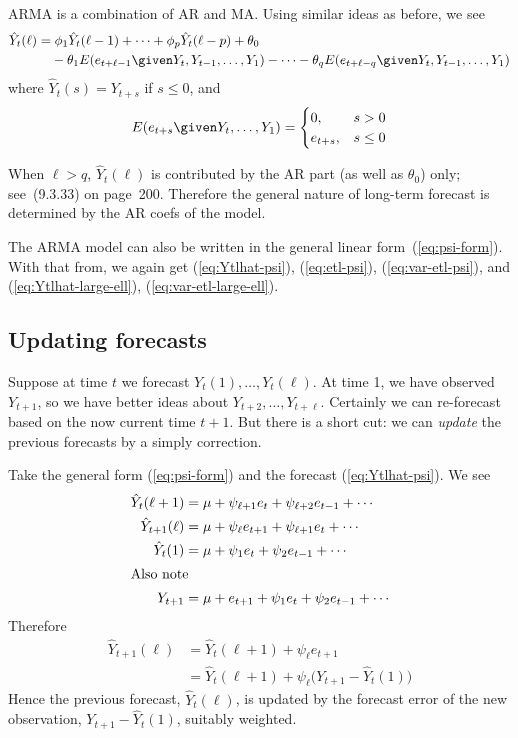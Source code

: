 \documentclass[12pt]{article}
\begin{document}
ARMA is a combination of AR and MA.
Using similar ideas as before, we see
\[\begin{split}
\hat{Y}_t(\ell)
&= \phi_1 \hat{Y}_t(\ell-1) + \dotsb + \phi_p \hat{Y}_t(\ell - p)
    + \theta_0
\\
&\phantom{\mathrel{=}\;}
    - \theta_1 E(e_{t+\ell-1} \given Y_t, Y_{t-1},\dotsc, Y_1)
    - \dotsb
    - \theta_q E(e_{t+\ell-q} \given Y_t, Y_{t-1},\dotsc, Y_1)
\end{split}
\]
where
$\hat{Y}_t(s) = Y_{t+s}$ if $s \le 0$,
and
\[
E(e_{t+s} \given Y_t,\dotsc,Y_1)
= \begin{cases}
0, & s > 0\\
e_{t+s}, & s \le 0
\end{cases}
\]

When $\ell > q$, $\hat{Y}_t(\ell)$ is contributed by the AR part
(as well as $\theta_0$) only;
see~(9.3.33) on page~200.
Therefore the general nature of long-term forecast is determined by the
AR coefs of the model.

The ARMA model can also be written in the general linear
form~(\ref{eq:psi-form}).
With that from,
we again get
(\ref{eq:Ytlhat-psi}),
(\ref{eq:etl-psi}),
(\ref{eq:var-etl-psi}),
and
(\ref{eq:Ytlhat-large-ell}),
(\ref{eq:var-etl-large-ell}).

\subsection{Updating forecasts}

Suppose at time $t$ we forecast
$Y_t(1),\dotsc,Y_t(\ell)$.
At time 1, we have observed $Y_{t+1}$,
so we have better ideas about $Y_{t+2},\dotsc,Y_{t+\ell}$.
Certainly we can re-forecast based on the now current time $t+1$.
But there is a short cut: we can \emph{update} the previous forecasts
by a simply correction.

Take the general form
(\ref{eq:psi-form}) and the forecast
(\ref{eq:Ytlhat-psi}).
We see
\[
\begin{split}
\hat{Y}_t(\ell + 1)
    &= \mu + \psi_{\ell+1} e_t + \psi_{\ell+2} e_{t-1} + \dotsb
\\
\hat{Y}_{t+1}(\ell)
    &= \mu + \psi_{\ell} e_{t+1} + \psi_{\ell+1} e_{t} + \dotsb
\\
\hat{Y}_{t}(1)
    &= \mu + \psi_{1} e_{t} + \psi_{2} e_{t-1} + \dotsb
\\
\intertext{Also note}
Y_{t+1}
    &= \mu + e_{t+1} + \psi_1 e_t + \psi_2 e_{t-1} + \dotsb
\end{split}
\]
Therefore
\[\begin{split}
\hat{Y}_{t+1}(\ell)
&= \hat{Y}_t(\ell + 1) + \psi_\ell e_{t+1}
\\
&= \hat{Y}_t(\ell + 1) + \psi_\ell \bigl(Y_{t+1} - \hat{Y}_t(1)\bigr)
\end{split}
\]
Hence the previous forecast,
$\hat{Y}_t(\ell)$,
is updated by the forecast error of the new observation,
$Y_{t+1} - \hat{Y}_t(1)$,
suitably weighted.
\end{document}

